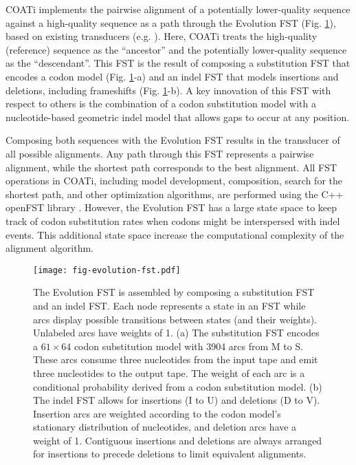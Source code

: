 COATi implements the pairwise alignment of a potentially lower-quality sequence against a high-quality sequence as a path through the Evolution FST (Fig. \ref{fig:evolution-fst}), based on existing transducers (e.g. \cite{holmes2001evolutionary}).
Here, COATi treats the high-quality (reference) sequence as the ``ancestor'' and the potentially lower-quality sequence as the ``descendant''.
This FST is the result of composing a substitution FST that encodes a codon model (Fig. \ref{fig:evolution-fst}-a) and an indel FST that models insertions and deletions, including frameshifts (Fig. \ref{fig:evolution-fst}-b).
A key innovation of this FST with respect to others is the combination of a codon substitution model with a nucleotide-based geometric indel model that allows gaps to occur at any position.

Composing both sequences with the Evolution FST results in the transducer of all possible alignments.
Any path through this FST represents a pairwise alignment, while the shortest path corresponds to the best alignment.
All FST operations in COATi, including model development, composition, search for the shortest path, and other optimization algorithms, are performed using the C++ openFST library \parencite{allauzen2007openfst}.
However, the Evolution FST has a large state space to keep track of codon substitution rates when codons might be interspersed with indel events. This additional state space increase the computational complexity of the alignment algorithm.

\begin{figure}[h!]
\centering
\texttt{[image: fig-evolution-fst.pdf]}
\par
\caption{The Evolution FST is assembled by composing a substitution FST and an indel FST.
Each node represents a state in an FST while arcs display possible transitions between states (and their weights). Unlabeled arcs have weights of 1.
(a) The substitution FST encodes a $61 \times 64 $ codon substitution model with 3904 arcs from M to S. These arcs consume three nucleotides from the input tape and emit three nucleotides to the output tape. The weight of each arc is a conditional probability derived from a codon substitution model. 
(b) The indel FST allows for insertions (I to U) and deletions (D to V). Insertion arcs are weighted according to the codon model's stationary distribution of nucleotides, and deletion arcs have a weight of 1. Contiguous insertions and deletions are always arranged for insertions to precede deletions to limit equivalent alignments.}
\label{fig:evolution-fst}
\end{figure}

